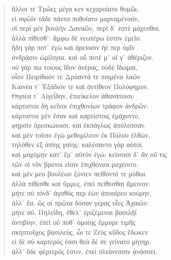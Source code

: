 \begin{Spacing}{1.5}
\begin{verse}
{\large\g ἄλλοι τε Τρῶες μέγα κεν κεχαροίατο θυμῶι,  } \\
{\large\g εἰ σφῶϊν τάδε πάντα πυθοίατο μαρναμένοιϊν,  } \\
{\large\g οἳ περὶ μὲν βουλὴν Δαναῶν, περὶ δ᾽ ἐστὲ μάχεσθαι.  } \\
{\large\g ἀλλὰ πίθεσθ᾽: ἄμφω δὲ νεωτέρω ἐστὸν ἐμεῖο.  } \\
{\large\g ἤδη γάρ ποτ᾽ ἐγὼ καὶ ἀρείοσιν ἠέ περ ὑμῖν  } \\
{\large\g ἀνδράσιν ὡμίλησα, καὶ οὔ ποτέ μ᾽ οἵ γ᾽ ἀθέριζον.  } \\
{\large\g οὐ γάρ πω τοίους ἴδον ἀνέρας, οὐδὲ ἴδωμαι,  } \\
{\large\g οἷον Πειρίθοόν τε Δρύαντά τε ποιμένα λαῶν  } \\
{\large\g Καινέα τ᾽ Ἐξάδιόν τε καὶ ἀντίθεον Πολύφημον.  } \\
{\large\g Θησέα τ᾽ Αἰγεΐδην, ἐπιείκελον ἀθανάτοισι:  } \\
{\large\g κάρτιστοι δὴ κεῖνοι ἐπιχθονίων τράφον ἀνδρῶν:  } \\
{\large\g κάρτιστοι μὲν ἔσαν καὶ καρτίστοις ἐμάχοντο,  } \\
{\large\g φηρσὶν ὀρεσκώιοισι, καὶ ἐκπάγλως ἀπόλεσσαν.  } \\
{\large\g καὶ μὲν τοῖσιν ἐγὼ μεθομίλεον ἐκ Πύλου ἐλθὼν,  } \\
{\large\g τηλόθεν ἐξ ἀπίης γαίης: καλέσαντο γὰρ αὐτοί.  } \\
{\large\g καὶ μαχόμην κατ᾽ ἔμ᾽ αὐτὸν ἐγώ: κείνοισι δ᾽ ἂν οὔ τις  } \\
{\large\g τῶν οἳ νῦν βροτοί εἰσιν ἐπιχθόνιοι μαχέοιτο.  } \\
{\large\g καὶ μέν μεο βουλέων ξύνιεν πείθοντό τε μύθωι.  } \\
{\large\g ἀλλὰ πίθεσθε καὶ ὔμμες, ἐπεὶ πείθεσθαι ἄμεινον:  } \\
{\large\g μήτε σὺ τόνδ᾽ ἀγαθός περ ἐὼν ἀποαίρεο κούρην,  } \\
{\large\g ἀλλ᾽ ἔα, ὥς οἱ πρῶτα δόσαν γέρας υἷες Ἀχαιῶν:  } \\
{\large\g μήτε σὺ, Πηλεΐδη, ἔθελ᾽ ἐριζέμεναι βασιλῆϊ  } \\
{\large\g ἀντιβίην, ἐπεὶ οὔ ποθ᾽ ὁμοίης ἔμμορε τιμῆς  } \\
{\large\g σκηπτοῦχος βασιλεύς, ὧι τε Ζεὺς κῦδος ἔδωκεν.  } \\
{\large\g εἰ δὲ σὺ καρτερός ἐσσι θεὰ δέ σε γείνατο μήτηρ,  } \\
{\large\g ἀλλ᾽ ὅδε φέρτερός ἐστιν, ἐπεὶ πλεόνεσσιν ἀνάσσει.  } \\

\end{verse}
\end{Spacing}
